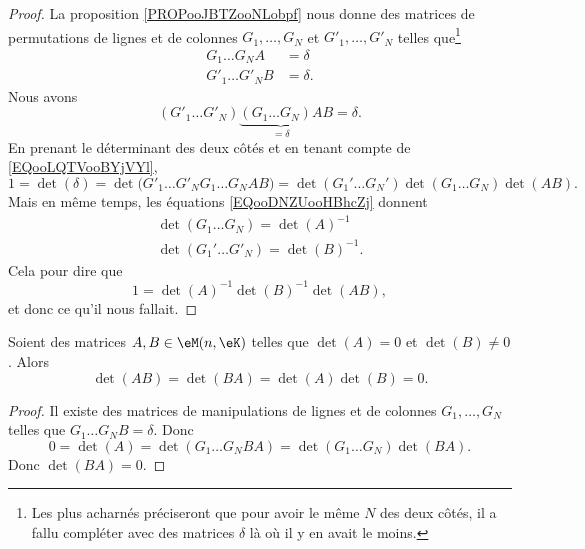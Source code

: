 \begin{proof}
	La proposition \ref{PROPooJBTZooNLobpf} nous donne des matrices de permutations de lignes et de colonnes \( G_1,\ldots, G_N\) et \( G'_1,\ldots, G'_N\) telles que\footnote{Les plus acharnés préciseront que pour avoir le même \( N\) des deux côtés, il a fallu compléter avec des matrices \( \delta\) là où il y en avait le moins.}
	\begin{subequations}        \label{EQooDNZUooHBhcZj}
		\begin{align}
			G_1\ldots G_NA   & =\delta  \\
			G'_1\ldots G'_NB & =\delta.
		\end{align}
	\end{subequations}
	Nous avons
	\begin{equation}
		(G'_1\ldots G'_N)\underbrace{(G_1\ldots G_N)A}_{=\delta}B=\delta.
	\end{equation}
	En prenant le déterminant des deux côtés et en tenant compte de \eqref{EQooLQTVooBYjVYl},
	\begin{equation}
		1=\det(\delta)=\det\big(  G'_1\ldots G'_NG_1\ldots G_NAB\big)=\det(G_1'\ldots G_N')\det(G_1\ldots G_N)\det(AB).
	\end{equation}
	Mais en même temps, les équations \ref{EQooDNZUooHBhcZj} donnent
	\begin{subequations}
		\begin{align}
			\det(G_1 \ldots G_N)  =\det(A)^{-1}   \\
			\det(G_1'\ldots G'_N) =\det(B)^{-1}.
		\end{align}
	\end{subequations}
	Cela pour dire que
	\begin{equation}
		1=\det(A)^{-1}\det(B)^{-1}\det(AB),
	\end{equation}
	et donc ce qu'il nous fallait.
\end{proof}

\begin{proposition}     \label{PROPooWVJFooTmqoec}
	Soient des matrices \( A,B\in \eM(n,\eK)\) telles que \( \det(A)=0\) et \( \det(B)\neq0\). Alors
	\begin{equation}
		\det(AB)=\det(BA)=\det(A)\det(B)=0.
	\end{equation}
\end{proposition}

\begin{proof}
	Il existe des matrices de manipulations de lignes et de colonnes \( G_1,\ldots, G_N\) telles que \( G_1\ldots G_NB=\delta\). Donc
	\begin{equation}
		0=\det(A)=\det(G_1\ldots G_NBA)=\det(G_1\ldots G_N)\det(BA).
	\end{equation}
	Donc \( \det(BA)=0\).
\end{proof}

